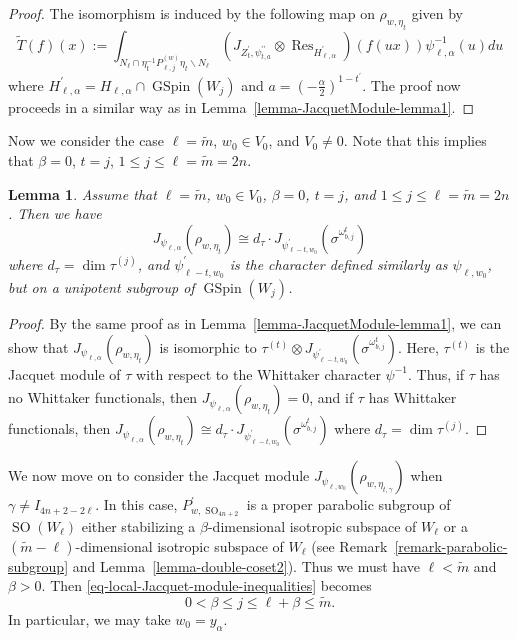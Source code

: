 \documentclass[12pt]{amsart}
\newcommand{\Res}{\operatorname{Res}}
\newcommand{\wt}{\widetilde}
\newtheorem{lemma}[theorem]{Lemma}
\theoremstyle{remark}
\DeclareMathOperator{\SO}{SO}
\DeclareMathOperator{\GSpin}{GSpin}
\begin{document}
\begin{proof}
The isomorphism is induced by the following map on $\rho_{w,\eta_t}$ given by
\begin{equation}
\label{eq-iso-T-2}
\wt T(f)(x):=\int_{N_{\ell}\cap \eta_t^{-1} P_{\ell,j}^{(w)}\eta_t \backslash N_{\ell} } \left( J_{Z_t^\prime,\psi_{t,a}^{\prime\prime}}\otimes \Res_{H_{\ell,\alpha}^\prime } \right) (f(ux)) \psi_{\ell,\alpha}^{-1}(u)du
\end{equation}  
where $H_{\ell,\alpha}^\prime=H_{\ell,\alpha}\cap \GSpin(W_{j})$ and $a=(-\frac{\alpha}{2})^{1-t^\prime}$.
The proof now proceeds in a similar way as in Lemma~\ref{lemma-JacquetModule-lemma1}. 
\end{proof}


Now we consider the case $\ell=\wt m$, $w_0\in V_0$, and $V_0\not=0$. Note that this implies that $\beta=0$, $t=j$, $1\le j\le \ell=\wt m=2n$.



\begin{lemma}
\label{lemma-JacquetModule-lemma3}
Assume that $\ell=\wt m$, $w_0\in V_0$, $\beta=0$, $t=j$, and $1\le j\le \ell=\wt m=2n$. Then we have  
\begin{equation*}
	J_{\psi_{\ell,\alpha}}(	\rho_{w,\eta_{t}} ) \cong   d_{\tau} \cdot J_{\psi_{\ell-t,w_0}^\prime}( \sigma^{\omega_{b,j}^t})
\end{equation*}
where $d_\tau=\dim \tau^{(j)}$, and $\psi_{\ell-t,w_0}^\prime$ is the character defined similarly as $\psi_{\ell,w_0}$, but on a unipotent subgroup of $\GSpin(W_j)$.
\end{lemma}

\begin{proof}
By the same proof as in Lemma~\ref{lemma-JacquetModule-lemma1}, we can show that $J_{\psi_{\ell,\alpha}}(	\rho_{w,\eta_{t}} )$ is isomorphic to $\tau^{(t)} \otimes J_{\psi_{\ell-t,w_0}^\prime}( \sigma^{\omega_{b,j}^t})$. Here, $\tau^{(t)}$ is the Jacquet module of $\tau$ with respect to the Whittaker character $\psi^{-1}$. Thus, if $\tau$ has no Whittaker functionals, then $J_{\psi_{\ell,\alpha}}(	\rho_{w,\eta_{t}} )=0$, and if $\tau$ has Whittaker functionals, then $J_{\psi_{\ell,\alpha}}(	\rho_{w,\eta_{t}} ) \cong   d_{\tau} \cdot J_{\psi_{\ell-t,w_0}^\prime}( \sigma^{\omega_{b,j}^t})$ where $d_\tau=\dim \tau^{(j)}$.
\end{proof}



We now move on to consider the Jacquet module $J_{\psi_{\ell, w_0}}(\rho_{w,\eta_{t,\gamma}})$ when $\gamma \not=I_{4n+2-2\ell}$. In this case, $P_{w, \SO_{4n+2}}^\prime$ is a proper parabolic subgroup of $\SO(W_{\ell})$ either stabilizing a $\beta$-dimensional isotropic subspace of $W_{\ell}$ or a $(\wt m-\ell)$-dimensional isotropic subspace of $W_{\ell}$ (see Remark~\ref{remark-parabolic-subgroup} and Lemma~\ref{lemma-double-coset2}). Thus we must have $\ell<\wt m$ and $\beta>0$. Then \eqref{eq-local-Jacquet-module-inequalities} becomes
\begin{equation}
\label{eq-local-Jacquet-module-inequalities-2}
0< \beta\le j \le \ell+\beta\le \wt m.	
\end{equation}
In particular, we may take $w_0=y_{\alpha}$. 
\end{document}
